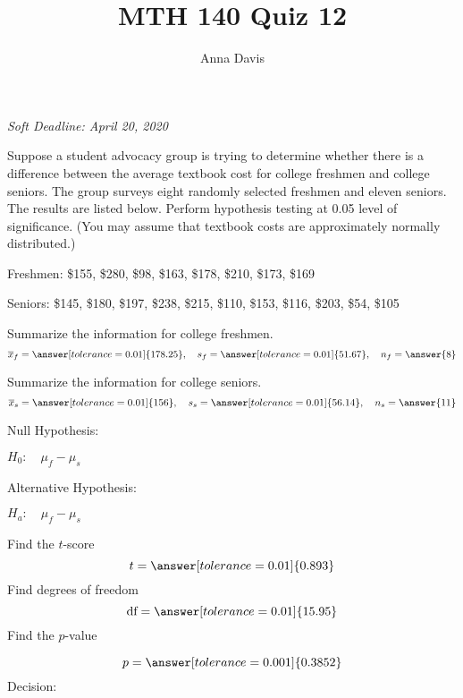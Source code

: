 \documentclass{ximera}
\author{Anna Davis} \title{MTH 140 Quiz 12}
\begin{document}
\begin{abstract}

\end{abstract}
\maketitle
 \textit{Soft Deadline: April 20, 2020}
\begin{problem}\label{prob:140quiz12prob1}
Suppose a student advocacy group is trying to determine whether there is a difference between the average textbook cost for college freshmen and college seniors.  The group surveys eight randomly selected freshmen and eleven seniors.  The results are listed below.  Perform hypothesis testing at 0.05 level of significance. (You may assume that textbook costs are approximately normally distributed.)

Freshmen: \$155, \$280, \$98, \$163, \$178, \$210, \$173, \$169

Seniors: \$145, \$180, \$197, \$238, \$215, \$110, \$153, \$116, \$203, \$54, \$105  

Summarize the information for college freshmen.
$$\overline{x}_f=\answer[tolerance=0.01]{178.25},\quad s_f=\answer[tolerance=0.01]{51.67},\quad n_f=\answer{8}$$

Summarize the information for college seniors.
$$\overline{x}_s=\answer[tolerance=0.01]{156},\quad s_s=\answer[tolerance=0.01]{56.14},\quad n_s=\answer{11}$$

Null Hypothesis:

$H_0:\quad \mu_f-\mu_s$ 

Alternative Hypothesis:

$H_a:\quad \mu_f-\mu_s$ 

Find the $t$-score
$$t=\answer[tolerance=0.01]{0.893}$$
Find degrees of freedom
$$\mbox{df}=\answer[tolerance=0.01]{15.95}$$
Find the $p$-value
\begin{center}  
\end{center}
$$p=\answer[tolerance=0.001]{0.3852}$$
Decision:

\begin{multipleChoice} 
\end{multipleChoice}  


\end{problem}
\end{document}
